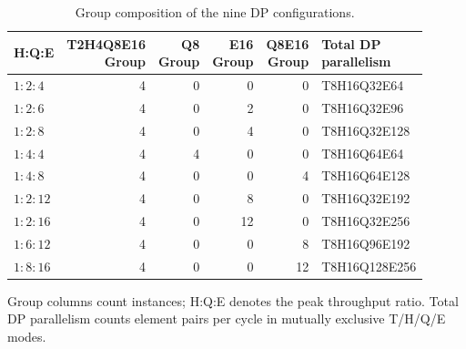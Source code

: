 \begin{table}[t]
\centering
\caption{Group composition of the nine DP configurations.}
\label{tab:ratio9_composition}
\begingroup
\footnotesize
\setlength{\tabcolsep}{2pt}
\begin{tabular*}{\columnwidth}{@{\extracolsep{\fill}}lrrrrl@{}}
\toprule
H:Q:E & \shortstack{T2H4Q8E16 \\Group} & \shortstack{Q8\\Group}& \shortstack{E16\\Group} & \shortstack{Q8E16\\Group} & \shortstack{Total DP\\parallelism} \\
\midrule
$1:2:4$  & 4 & 0 & 0  & 0  & T8H16Q32E64   \\
$1:2:6$  & 4 & 0 & 2  & 0  & T8H16Q32E96   \\
$1:2:8$  & 4 & 0 & 4  & 0  & T8H16Q32E128  \\
$1:4:4$  & 4 & 4 & 0  & 0  & T8H16Q64E64   \\
$1:4:8$  & 4 & 0 & 0  & 4  & T8H16Q64E128  \\
$1:2:12$ & 4 & 0 & 8  & 0  & T8H16Q32E192  \\
$1:2:16$ & 4 & 0 & 12 & 0  & T8H16Q32E256  \\
$1:6:12$ & 4 & 0 & 0  & 8  & T8H16Q96E192  \\
$1:8:16$ & 4 & 0 & 0  & 12 & T8H16Q128E256 \\
\bottomrule
\end{tabular*}
\par\smallskip
\parbox{\columnwidth}{\raggedright
Group columns count instances; H:Q:E denotes the peak throughput ratio.
Total DP parallelism counts element pairs per cycle in mutually exclusive
T/H/Q/E modes.}
\endgroup
\end{table}
